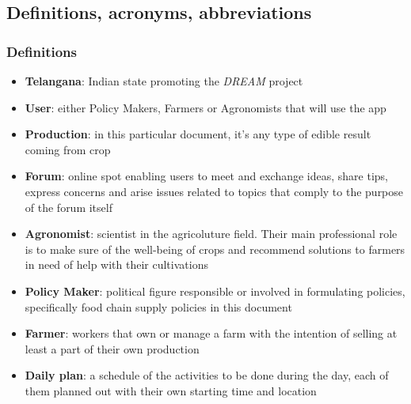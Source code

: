 \documentclass[table, 12pt]{article}
\begin{document}
\subsection{Definitions, acronyms, abbreviations}
\subsubsection*{Definitions}
\begin{itemize}
    \item \textbf{Telangana}: Indian state promoting the \emph{DREAM} project
    \item \textbf{User}: either Policy Makers, Farmers or Agronomists that will use the app
    \item \textbf{Production}: in this particular document, it's any type of edible result coming from crop
    \item \textbf{Forum}: online spot enabling users to meet and exchange ideas, share tips, express concerns and arise issues related to topics that comply to the purpose of the forum itself
    \item \textbf{Agronomist}: scientist in the agricoluture field. Their main professional role is to make sure of the well-being of crops and recommend solutions to farmers in need of help with their cultivations 
    \item \textbf{Policy Maker}: political figure responsible or involved in formulating policies, specifically food chain supply policies in this document
    \item \textbf{Farmer}: workers that own or manage a farm with the intention of selling at least a part of their own production
    \item \textbf{Daily plan}: a schedule of the activities to be done during the day, each of them planned out with their own starting time and location
\end{itemize}
\end{document}
